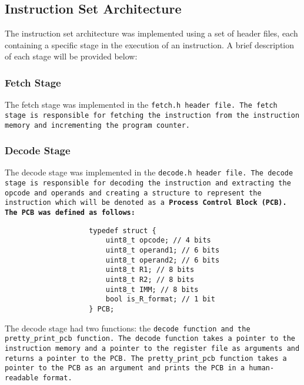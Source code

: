 \documentclass[a4paper,12pt]{article}
\begin{document}
	\subsection{Instruction Set Architecture}
		\par{
			The instruction set architecture was implemented using a set of header
			files, each containing a specific stage in the execution of an instruction.
			A brief description of each stage will be provided below:
		}
		\subsubsection{Fetch Stage}
			\par{
				The fetch stage was implemented in the \tt{fetch.h} header file. The
				fetch stage is responsible for fetching the instruction from the
				instruction memory and incrementing the program counter. 
			}
		
		\subsubsection{Decode Stage}
			\par{
				The decode stage was implemented in the \tt{decode.h} header
				file. The decode stage is responsible for decoding the
				instruction and extracting the opcode and operands and creating
				a structure to represent the instruction which will be denoted
				as a \bf{Process Control Block} (PCB). The PCB was defined as
				follows:
				\begin{lstlisting}
					typedef struct {
						uint8_t opcode; // 4 bits
						uint8_t operand1; // 6 bits
						uint8_t operand2; // 6 bits
						uint8_t R1; // 8 bits
						uint8_t R2; // 8 bits
						uint8_t IMM; // 8 bits
						bool is_R_format; // 1 bit
					} PCB;
				\end{lstlisting}
			}
			\par{
				The decode stage had two functions: the \tt{decode} function and
				the \tt{pretty\_print\_pcb} function. The \tt{decode} function
				takes a pointer to the instruction memory and a pointer to the
				register file as arguments and returns a pointer to the PCB. The
				\tt{pretty\_print\_pcb} function takes a pointer to the PCB as an
				argument and prints the PCB in a human-readable format.
			}
\end{document}
